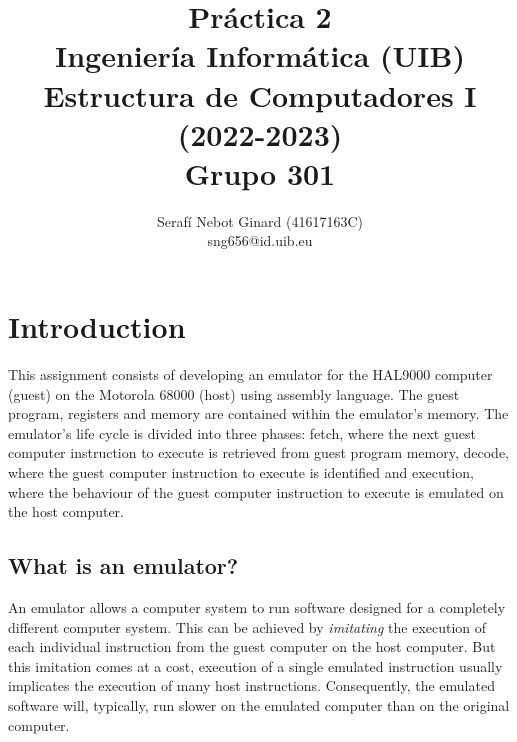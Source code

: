 \documentclass[11pt, a4paper]{article}
\title{{\huge Práctica 2}\\\vspace{1em}Ingeniería Informática (UIB)\\Estructura de Computadores I (2022-2023)\\Grupo 301}
\author{Serafí Nebot Ginard (41617163C)\\sng656@id.uib.eu}
\date{}
\begin{document}
\renewcommand{\familydefault}{ppl}
\selectfont

\begin{titlingpage}
	\clearpage\maketitle
\end{titlingpage}
\thispagestyle{empty}
\pagebreak

\tableofcontents

\pagebreak
\section{Introduction}
This assignment consists of developing an emulator for the HAL9000 computer (guest) on the Motorola
68000 (host) using assembly language. The guest program, registers and memory are contained within
the emulator's memory. The emulator's life cycle is divided into three phases:
fetch, where the next guest computer instruction to execute is retrieved from guest program memory,
decode, where the guest computer instruction to execute is identified and execution, where the
behaviour of the guest computer instruction to execute is emulated on the host computer.

\subsection{What is an emulator?}
An emulator allows a computer system to run software designed for a completely different computer
system. This can be achieved by \emph{imitating} the execution of each individual instruction from the
guest computer on the host computer. But this imitation comes at a cost, execution of a single
emulated instruction usually implicates the execution of many host instructions. Consequently, the emulated
software will, typically, run slower on the emulated computer than on the original computer.
\end{document}
